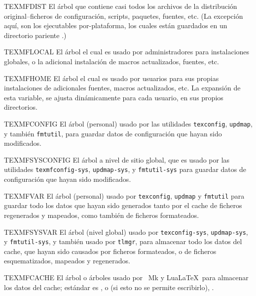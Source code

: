 \documentclass{article}
\begin{document}
\begin{ttdescription}
\item [TEXMFDIST] El árbol que contiene casi todos los
	archivos de la distribución original--ficheros de configuración, scripts, paquetes, fuentes, etc. (La excepción aquí, son los ejecutables por-plataforma, los cuales están guardados en un directorio pariente .)
\item [TEXMFLOCAL] El árbol el cual es usado por administradores para instalaciones globales, o la adicional instalación de macros actualizados, fuentes, etc.
\item [TEXMFHOME] El árbol el cual es usado por usuarios para sus propias instalaciones de adicionales fuentes, macros actualizados, etc. La expansión de esta variable, se ajusta dinámicamente para cada usuario, en sus propios directorios.
\item [TEXMFCONFIG] El árbol (personal) usado por las utilidades \verb+texconfig+, \verb+updmap+, y también \verb+fmtutil+, para guardar datos de configuración que hayan sido modificados. 
\item [TEXMFSYSCONFIG] El árbol a nivel de sitio global, que es usado por las utilidades \verb+texmfconfig-sys+, \verb+updmap-sys+, y \verb+fmtutil-sys+ para guardar datos de configuración que hayan sido modificados.
\item [TEXMFVAR] El árbol (personal) usado por \verb+texconfig+, \verb+updmap+ y \verb+fmtutil+ para guardar todo los datos que hayan sido generados tanto por el cache de ficheros regenerados y mapeados, como también de ficheros formateados.
\item [TEXMFSYSVAR] El árbol (nivel global) usado por \verb+texconfig-sys+, \verb+updmap-sys+, y \verb+fmtutil-sys+, y también usado por \verb+tlmgr+, para almacenar todo los datos del cache, que hayan sido causados por ficheros formateados, o de ficheros esquematizados, mapeados y regenerados.
\item [TEXMFCACHE] El árbol o árboles usado por \ConTeXt\ Mk y Lua\LaTeX\ para almacenar los datos del cache; estándar es , o (si esto no se permite escribirlo), .
\end{ttdescription}
\end{document}
